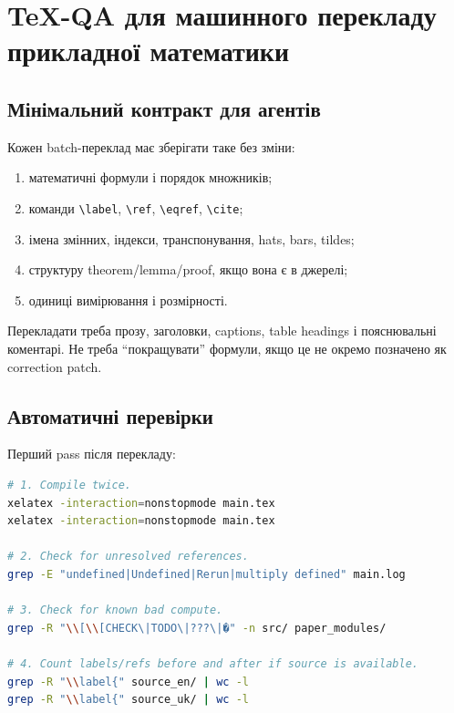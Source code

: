 \chapter{TeX-QA для машинного перекладу прикладної математики}
\label{ch:tex-qa-machine-translation}

\section{Мінімальний контракт для агентів}

Кожен batch-переклад має зберігати таке без зміни:

\begin{enumerate}[label=\arabic*.]
\item математичні формули і порядок множників;
\item команди \verb|\label|, \verb|\ref|, \verb|\eqref|, \verb|\cite|;
\item імена змінних, індекси, транспонування, hats, bars, tildes;
\item структуру theorem/lemma/proof, якщо вона є в джерелі;
\item одиниці вимірювання і розмірності.
\end{enumerate}

Перекладати треба прозу, заголовки, captions, table headings і пояснювальні коментарі. Не треба ``покращувати'' формули, якщо це не окремо позначено як correction patch.

\section{Автоматичні перевірки}

Перший pass після перекладу:
\begin{lstlisting}[language=bash]
# 1. Compile twice.
xelatex -interaction=nonstopmode main.tex
xelatex -interaction=nonstopmode main.tex

# 2. Check for unresolved references.
grep -E "undefined|Undefined|Rerun|multiply defined" main.log

# 3. Check for known bad compute.
grep -R "\\[\\[CHECK\|TODO\|???\|�" -n src/ paper_modules/

# 4. Count labels/refs before and after if source is available.
grep -R "\\label{" source_en/ | wc -l
grep -R "\\label{" source_uk/ | wc -l
\end{lstlisting}

